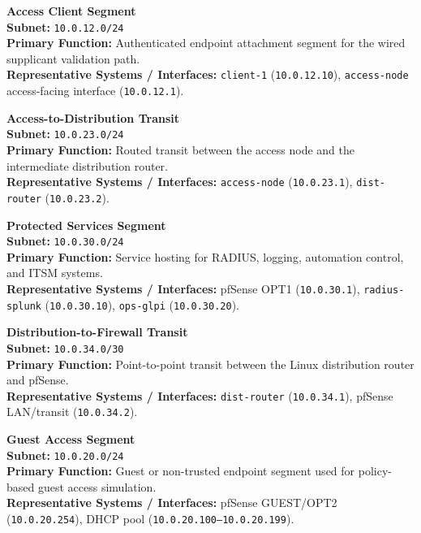 \documentclass[11pt]{article}
\begin{document}
\medskip

\textbf{Access Client Segment} \\
\textbf{Subnet:} \texttt{10.0.12.0/24} \\
\textbf{Primary Function:} Authenticated endpoint attachment segment for the wired supplicant validation path. \\
\textbf{Representative Systems / Interfaces:} \texttt{client-1} (\texttt{10.0.12.10}), \texttt{access-node} access-facing interface (\texttt{10.0.12.1}).

\medskip

\textbf{Access-to-Distribution Transit} \\
\textbf{Subnet:} \texttt{10.0.23.0/24} \\
\textbf{Primary Function:} Routed transit between the access node and the intermediate distribution router. \\
\textbf{Representative Systems / Interfaces:} \texttt{access-node} (\texttt{10.0.23.1}), \texttt{dist-router} (\texttt{10.0.23.2}).

\medskip

\textbf{Protected Services Segment} \\
\textbf{Subnet:} \texttt{10.0.30.0/24} \\
\textbf{Primary Function:} Service hosting for RADIUS, logging, automation control, and ITSM systems. \\
\textbf{Representative Systems / Interfaces:} pfSense OPT1 (\texttt{10.0.30.1}), \texttt{radius-splunk} (\texttt{10.0.30.10}), \texttt{ops-glpi} (\texttt{10.0.30.20}).

\medskip

\textbf{Distribution-to-Firewall Transit} \\
\textbf{Subnet:} \texttt{10.0.34.0/30} \\
\textbf{Primary Function:} Point-to-point transit between the Linux distribution router and pfSense. \\
\textbf{Representative Systems / Interfaces:} \texttt{dist-router} (\texttt{10.0.34.1}), pfSense LAN/transit (\texttt{10.0.34.2}).

\medskip

\textbf{Guest Access Segment} \\
\textbf{Subnet:} \texttt{10.0.20.0/24} \\
\textbf{Primary Function:} Guest or non-trusted endpoint segment used for policy-based guest access simulation. \\
\textbf{Representative Systems / Interfaces:} pfSense GUEST/OPT2 (\texttt{10.0.20.254}), DHCP pool (\texttt{10.0.20.100--10.0.20.199}).
\end{document}
